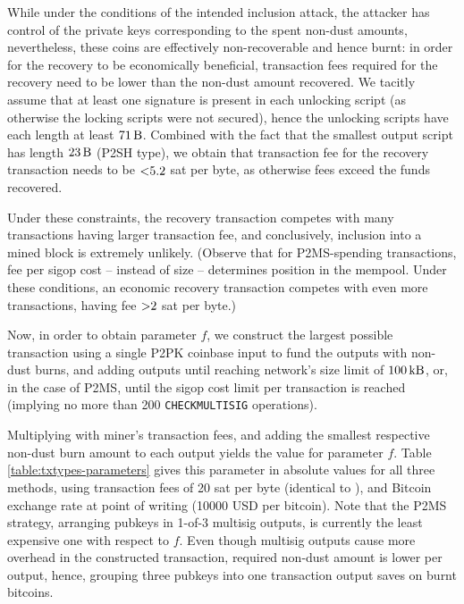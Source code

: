 \documentclass[a4paper,11pt,titlepage]{scrbook}
\begin{document}
While under the conditions of the intended inclusion attack, the attacker has control of the private keys corresponding to the spent non-dust amounts, nevertheless, these coins are effectively non-recoverable and hence burnt: in order for the recovery to be economically beneficial, transaction fees required for the recovery need to be lower than the non-dust amount recovered.
We tacitly assume that at least one signature is present in each unlocking script (as otherwise the locking scripts were not secured), hence the unlocking scripts have each length at least $\SI{71}{\byte}$. Combined with the fact that the smallest output script has length $\SI{23}{\byte}$ (P2SH type), we obtain that transaction fee for the recovery transaction needs to be $\num{<5.2}$ sat per byte, as otherwise fees exceed the funds recovered.

Under these constraints, the recovery transaction competes with many transactions having larger transaction fee, and conclusively, inclusion into a mined block is extremely unlikely.
(Observe that for P2MS-spending transactions, fee per sigop cost – instead of size – determines position in the mempool. Under these conditions, an economic recovery transaction competes with even more transactions, having fee $\num{>2}$ sat per byte.)


Now, in order to obtain parameter $f$, we construct the largest possible transaction  using a single P2PK coinbase input to fund the outputs with non-dust burns, and adding outputs until reaching network's size limit of $\SI{100}{\kilo\byte}$, or, in the case of P2MS, until the sigop cost limit per transaction is reached (implying no more than 200 \texttt{CHECKMULTISIG} operations).

Multiplying with miner's transaction fees, and adding the smallest respective non-dust burn amount to each output yields the value for parameter $f$.
Table \ref{table:txtypes-parameters} gives this parameter in absolute values for all three methods, using transaction fees of 20 sat per byte (identical to \cite{sward_data_2018}), and Bitcoin exchange rate at point of writing (\num{10000} USD per bitcoin).
Note that the P2MS strategy, arranging pubkeys in 1-of-3 multisig outputs, is currently the least expensive one with respect to $f$.
Even though multisig outputs cause more overhead in the constructed transaction, required non-dust amount is lower per output, hence, grouping three pubkeys into one transaction output saves on burnt bitcoins.
\end{document}
